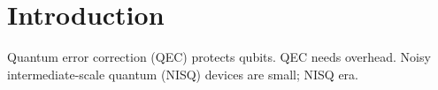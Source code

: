 \documentclass{article}
\begin{document}
\section{Introduction}
Quantum error correction (QEC) protects qubits. QEC needs overhead.
Noisy intermediate-scale quantum (NISQ) devices are small; NISQ era.
\end{document}
